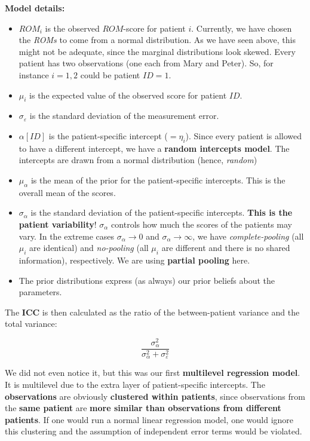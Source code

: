 \documentclass[
]{book}
\providecommand{\tightlist}{%
  \setlength{\itemsep}{0pt}\setlength{\parskip}{0pt}}
\begin{document}
\textbf{Model details:}

\begin{itemize}
\tightlist
\item
  \(ROM_i\) is the observed \(ROM\)-score for patient \(i\). Currently, we have chosen the \emph{ROMs} to
  come from a normal distribution. As we have seen above, this might not be adequate,
  since the marginal distributions look skewed.
  Every patient has two observations (one each from Mary and Peter).
  So, for instance \(i=1,2\) could be patient \(ID=1\).
\item
  \(\mu_i\) is the expected value of the observed score for patient \(ID\).
\item
  \(\sigma_{\varepsilon}\) is the standard deviation of the measurement error.
\item
  \(\alpha[ID]\) is the patient-specific intercept (\(=\eta_i\)).
  Since every patient is allowed to have a different intercept,
  we have a \textbf{random intercepts model}.
  The intercepts are drawn from a normal distribution (hence, \emph{random})
\item
  \(\mu_{\alpha}\) is the mean of the prior for the patient-specific intercepts.
  This is the overall mean of the scores.
\item
  \(\sigma_{\alpha}\) is the standard deviation of the patient-specific intercepts.
  \textbf{This is the patient variability}! \(\sigma_{\alpha}\) controls how much
  the scores of the patients may vary.
  In the extreme cases \(\sigma_{\alpha} \rightarrow 0\) and \(\sigma_{\alpha} \rightarrow \infty\),
  we have \emph{complete-pooling} (all \(\mu_i\) are identical) and \emph{no-pooling}
  (all \(\mu_i\) are different and there is no shared information), respectively.
  We are using \textbf{partial pooling} here.
\item
  The prior distributions express (as always) our prior beliefs about the parameters.
\end{itemize}

The \textbf{ICC} is then calculated as the ratio of the between-patient variance and
the total variance:

\[\frac{\sigma_{\alpha}^2}{\sigma_{\alpha}^2 + \sigma_{\varepsilon}^2}\]

We did not even notice it, but this was our first \textbf{multilevel regression model}.
It is multilevel due to the extra layer of patient-specific intercepts.
The \textbf{observations} are obviously \textbf{clustered within patients}, since observations
from the \textbf{same patient} are \textbf{more similar than observations from different patients}.
If one would run a normal linear regression model, one would ignore this clustering
and the assumption of independent error terms would be violated.
\end{document}
